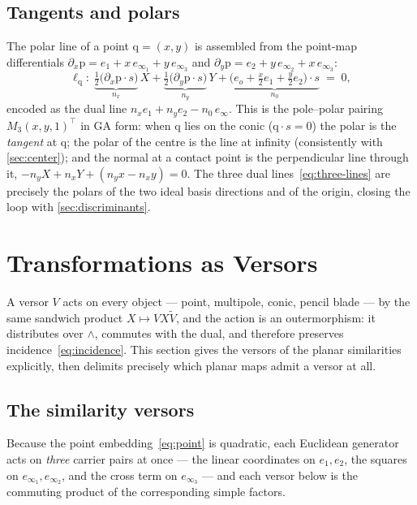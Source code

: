 \documentclass{birkjour}
\theoremstyle{definition}
\theoremstyle{remark}
\newcommand{\eo}{e_o}
\newcommand{\einf}{e_\infty}
\newcommand{\joinp}{\wedge}
\begin{document}
\subsection{Tangents and polars}
\label{sec:polars}
The polar line of a point $\mathrm{q}=(x,y)$ is assembled from the point-map
differentials $\partial_x\mathrm{p} = e_1 + x\,e_{\infty_1}+y\,e_{\infty_3}$
and $\partial_y\mathrm{p} = e_2 + y\,e_{\infty_2}+x\,e_{\infty_3}$:
\begin{equation}\label{eq:polar}
  \ell_{\mathrm{q}} :\;
  \underbrace{\tfrac12\big(\partial_x\mathrm{p}\cdot s\big)}_{n_x}\,X
  +\underbrace{\tfrac12\big(\partial_y\mathrm{p}\cdot s\big)}_{n_y}\,Y
  +\underbrace{\big(\eo+\tfrac{x}2 e_1+\tfrac{y}2 e_2\big)\cdot s}_{n_0}
  \;=\;0,
\end{equation}
encoded as the dual line $n_x e_1+n_y e_2-n_0\,\einf$. This is the pole--polar
pairing $M_3(x,y,1)^{\!\top}$ in GA form: when $\mathrm{q}$ lies on the conic
($\mathrm{q}\cdot s=0$) the polar is the \emph{tangent} at $\mathrm{q}$; the
polar of the centre is the line at infinity (consistently with
\cref{sec:center}); and the normal at a contact point is the perpendicular
line through it, $-n_y X + n_x Y + (n_y x - n_x y)=0$. The three dual
lines~\eqref{eq:three-lines} are precisely the polars of the two ideal basis
directions and of the origin, closing the loop with
\cref{sec:discriminants}.

\section{Transformations as Versors}
\label{sec:transforms}
A versor $V$ acts on every object --- point, multipole, conic, pencil blade
--- by the same sandwich product $X \mapsto V X \tilde V$, and the action is
an outermorphism: it distributes over $\joinp$, commutes with the dual, and
therefore preserves incidence~\eqref{eq:incidence}. This section gives the
versors of the planar similarities explicitly, then delimits precisely which
planar maps admit a versor at all.

\subsection{The similarity versors}
Because the point embedding~\eqref{eq:point} is quadratic, each Euclidean
generator acts on \emph{three} carrier pairs at once --- the linear
coordinates on $e_1,e_2$, the squares on $e_{\infty_1},e_{\infty_2}$, and the
cross term on $e_{\infty_3}$ --- and each versor below is the commuting
product of the corresponding simple factors.
\end{document}
